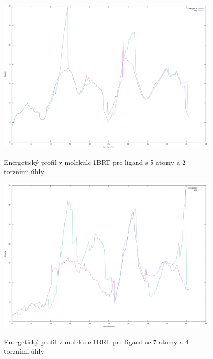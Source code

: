\begin{figure}[ht]
\centering
\begin{minipage}{.49\textwidth}
  \centering
    \includegraphics[width=1\textwidth]{img/1BRT_energy_0.png}
    \caption{Energetický profil v molekule 1BRT pro ligand s 5 atomy a 2 torzními úhly}
  \centering
  \label{fig:1BRT_energy_0}
\end{minipage}%
\hfill
\begin{minipage}{.49\textwidth}
     \centering
    \includegraphics[width=1\textwidth]{img/1BRT_energy_1.png}
    \caption{Energetický profil v molekule 1BRT pro ligand se 7 atomy a 4 torzními úhly}
  \centering
  \label{fig:1BRT_energy_1}
\end{minipage}
\end{figure}


